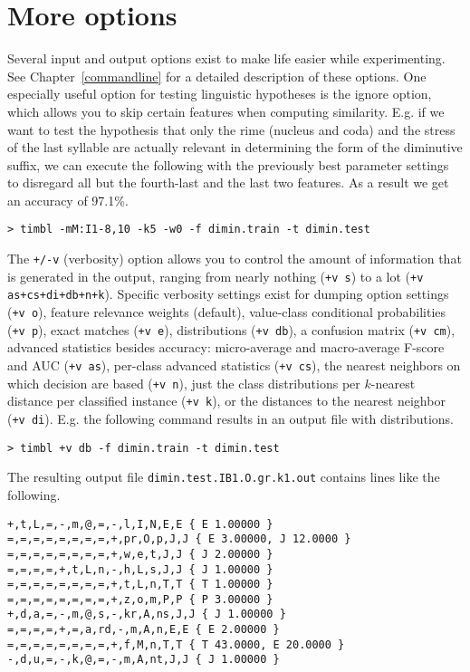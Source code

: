 \documentclass{book}
\begin{document}
\section{More options}

Several input and output options exist to make life easier while
experimenting. See Chapter~\ref{commandline} for a detailed
description of these options. One especially useful option for testing
linguistic hypotheses is the ignore option, which allows you to skip
certain features when computing similarity. E.g. if we want to test
the hypothesis that only the rime (nucleus and coda) and the stress of
the last syllable are actually relevant in determining the form of the
diminutive suffix, we can execute the following with the previously
best parameter settings to disregard all but the fourth-last and the
last two features. As a result we get an accuracy of
97.1\%.

{\footnotesize
\begin{verbatim}
> timbl -mM:I1-8,10 -k5 -w0 -f dimin.train -t dimin.test
\end{verbatim}
}

The {\tt +/-v} (verbosity) option allows you to control the amount of
information that is generated in the output, ranging from nearly nothing
({\tt +v s}) to a lot ({\tt +v as+cs+di+db+n+k}). Specific
verbosity settings exist for dumping option settings ({\tt +v o}),
feature relevance weights (default), value-class conditional
probabilities ({\tt +v p}), exact matches ({\tt +v e}), distributions
({\tt +v db}), a confusion matrix ({\tt +v cm}), advanced statistics
besides accuracy: micro-average and macro-average F-score and AUC
({\tt +v as}), per-class advanced statistics ({\tt +v cs}), the
nearest neighbors on which decision are based ({\tt +v n}), just the
class distributions per $k$-nearest distance per classified instance
({\tt +v k}), or the distances to the nearest neighbor ({\tt +v
  di}). E.g. the following command results in an output file with
distributions.

{\footnotesize
\begin{verbatim}
> timbl +v db -f dimin.train -t dimin.test
\end{verbatim}
}

The resulting output file {\tt dimin.test.IB1.O.gr.k1.out} contains
lines like the following.

{\footnotesize
\begin{verbatim}
+,t,L,=,-,m,@,=,-,l,I,N,E,E { E 1.00000 }
=,=,=,=,=,=,=,=,+,pr,O,p,J,J { E 3.00000, J 12.0000 }
=,=,=,=,=,=,=,=,+,w,e,t,J,J { J 2.00000 }
=,=,=,=,+,t,L,n,-,h,L,s,J,J { J 1.00000 }
=,=,=,=,=,=,=,=,+,t,L,n,T,T { T 1.00000 }
=,=,=,=,=,=,=,=,+,z,o,m,P,P { P 3.00000 }
+,d,a,=,-,m,@,s,-,kr,A,ns,J,J { J 1.00000 }
=,=,=,=,+,=,a,rd,-,m,A,n,E,E { E 2.00000 }
=,=,=,=,=,=,=,=,+,f,M,n,T,T { T 43.0000, E 20.0000 }
-,d,u,=,-,k,@,=,-,m,A,nt,J,J { J 1.00000 }
\end{verbatim}
}
\end{document}
